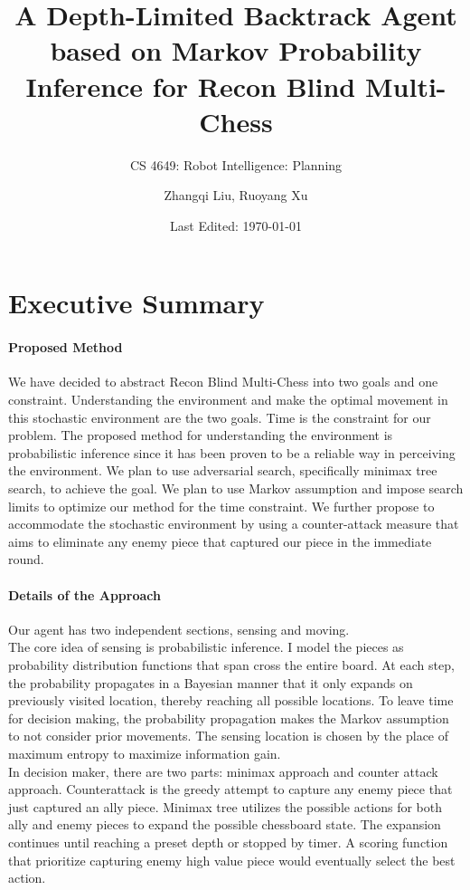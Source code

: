 \documentclass[11pt]{article}
\title{A Depth-Limited Backtrack Agent based on Markov Probability Inference for Recon Blind Multi-Chess}
\author{Zhangqi Liu, Ruoyang Xu}
\subtitle{CS 4649: Robot Intelligence: Planning}
\date{Last Edited: \today}
\begin{document}
\maketitle
\pagebreak

\section*{Executive Summary}
\paragraph{Proposed Method}
We have decided to abstract Recon Blind Multi-Chess into two goals and one constraint. Understanding the environment and make the optimal movement in this stochastic environment are the two goals. Time is the constraint for our problem. The proposed method for understanding the environment is probabilistic inference since it has been proven to be a reliable way in perceiving the environment. We plan to use adversarial search, specifically minimax tree search, to achieve the goal. We plan to use Markov assumption and impose search limits to optimize our method for the time constraint. We further propose to accommodate the stochastic environment by using a counter-attack measure that aims to eliminate any enemy piece that captured our piece in the immediate round. 
\paragraph{Details of the Approach}
Our agent has two independent sections, sensing and moving.\vspace{6pt}\\
The core idea of sensing is probabilistic inference. I model the pieces as probability distribution functions that span cross the entire board. At each step, the probability propagates in a Bayesian manner that it only expands on previously visited location, thereby reaching all possible locations. To leave time for decision making, the probability propagation makes the Markov assumption to not consider prior movements. The sensing location is chosen by the place of maximum entropy to maximize information gain. \vspace{6pt}\\
In decision maker, there are two parts: minimax approach and counter attack approach. Counterattack is the greedy attempt to capture any enemy piece that just captured an ally piece. Minimax tree utilizes the possible actions for both ally and enemy pieces to expand the possible chessboard state. The expansion continues until reaching a preset depth or stopped by timer. A scoring function that prioritize capturing enemy high value piece would eventually select the best action.
\end{document}
